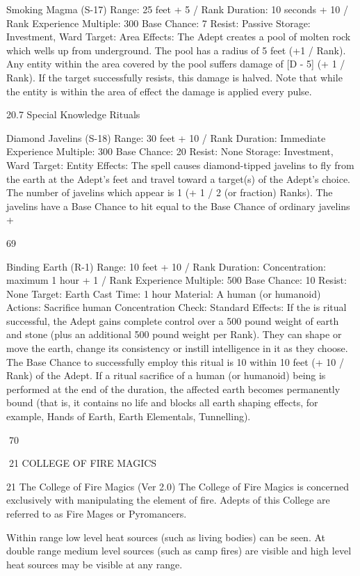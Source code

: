 \documentclass[a4paper]{article}
\begin{document}
\begin{multicols}{3}
Smoking Magma (S-17)
Range: 25 feet + 5 / Rank
Duration: 10 seconds + 10 / Rank
Experience Multiple: 300
Base Chance: 7%
Resist: Passive
Storage: Investment, Ward
Target: Area
Effects: The Adept creates a pool of molten rock
which wells up from underground. The pool has a
radius of 5 feet (+1 / Rank). Any entity within the
area covered by the pool suffers damage of [D - 5]
(+ 1 / Rank). If the target successfully resists, this
damage is halved. Note that while the entity is
within the area of effect the damage is applied
every pulse.

20.7 Special Knowledge Rituals

Diamond Javelins (S-18)
Range: 30 feet + 10 / Rank
Duration: Immediate
Experience Multiple: 300
Base Chance: 20%
Resist: None
Storage: Investment, Ward
Target: Entity
Effects: The spell causes diamond-tipped javelins
to fly from the earth at the Adept’s feet and travel
toward a target(s) of the Adept’s choice. The number of javelins which appear is 1 (+ 1 / 2 (or fraction) Ranks). The javelins have a Base Chance to
hit equal to the Base Chance of ordinary javelins +

69

Binding Earth (R-1)
Range: 10 feet + 10 / Rank
Duration: Concentration: maximum 1 hour + 1 /
Rank
Experience Multiple: 500
Base Chance: 10%
Resist: None
Target: Earth
Cast Time: 1 hour
Material: A human (or humanoid)
Actions: Sacrifice human
Concentration Check: Standard
Effects: If the is ritual successful, the Adept gains
complete control over a 500 pound weight of earth
and stone (plus an additional 500 pound weight per
Rank). They can shape or move the earth, change
its consistency or instill intelligence in it as they
choose. The Base Chance to successfully employ
this ritual is 10%
within 10 feet (+ 10 / Rank) of the Adept. If a ritual
sacrifice of a human (or humanoid) being is performed at the end of the duration, the affected earth
becomes permanently bound (that is, it contains no
life and blocks all earth shaping effects, for example, Hands of Earth, Earth Elementals, Tunnelling).

70

21 COLLEGE OF FIRE MAGICS

21 The College of Fire Magics (Ver 2.0)
The College of Fire Magics is concerned exclusively with manipulating the element of fire. Adepts of this College are referred to as Fire Mages or
Pyromancers.

Within range low level heat sources (such as living
bodies) can be seen. At double range medium level
sources (such as camp fires) are visible and high
level heat sources may be visible at any range.


\end{multicols}
\end{document}
